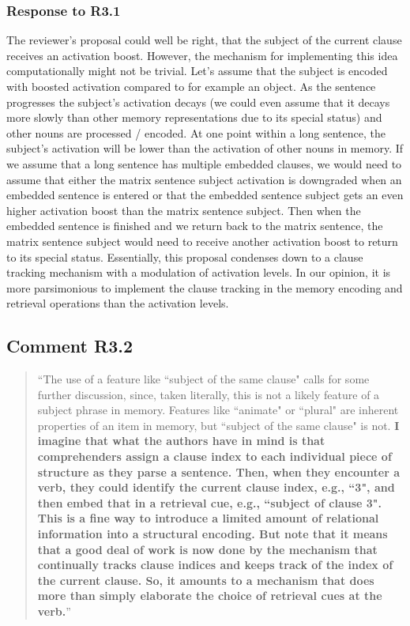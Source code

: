 \documentclass[12pt]{article}
\begin{document}
\subsubsection*{Response to R3.1}
The reviewer's proposal could well be right, that the subject of the current clause receives an activation boost. However, the mechanism for implementing this idea computationally might not be trivial. Let's assume that the subject is encoded with boosted activation compared to for example an object. As the sentence progresses the subject's activation decays (we could even assume that it decays more slowly than other memory representations due to its special status) and other nouns are processed / encoded. At one point within a long sentence, the subject's activation will be lower than the activation of other nouns in memory. If we assume that a long sentence has multiple embedded clauses, we would need to assume that either the matrix sentence subject activation is downgraded when an embedded sentence is entered or that the embedded sentence subject gets an even higher activation boost than the matrix sentence subject. Then when the embedded sentence is finished and we return back to the matrix sentence, the matrix sentence subject would need to receive another activation boost to return to its special status. Essentially, this proposal condenses down to a clause tracking mechanism with a modulation of activation levels. In our opinion, it is more parsimonious to implement the clause tracking in the memory encoding and retrieval operations than the activation levels. 

\subsection*{Comment R3.2}
\begin{quote}
``The use of a feature like ``subject of the same clause" calls for some further discussion, since, taken literally, this is not a likely feature of a subject phrase in memory. Features like ``animate" or ``plural" are inherent properties of an item in memory, but ``subject of the same clause" is not. \textbf{I imagine that what the authors have in mind is that comprehenders assign a clause index to each individual piece of structure as they parse a sentence. Then, when they encounter a verb, they could identify the current clause index, e.g., ``3", and then embed that in a retrieval cue, e.g., ``subject of clause 3". This is a fine way to introduce a limited amount of relational information into a structural encoding. But note that it means that a good deal of work is now done by the mechanism that continually tracks clause indices and keeps track of the index of the current clause. So, it amounts to a mechanism that does more than simply elaborate the choice of retrieval cues at the verb.}''
\end{quote}
\end{document}
